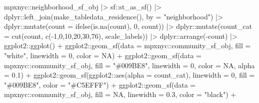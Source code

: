 \documentclass[
  letterpaper,
  DIV=11,
  numbers=noendperiod,
  oneside]{scrreprt}
\newenvironment{Shaded}{\begin{snugshade}}{\end{snugshade}}
\newcommand{\AttributeTok}[1]{\textcolor[rgb]{0.40,0.45,0.13}{#1}}
\newcommand{\ConstantTok}[1]{\textcolor[rgb]{0.56,0.35,0.01}{#1}}
\newcommand{\DecValTok}[1]{\textcolor[rgb]{0.68,0.00,0.00}{#1}}
\newcommand{\FloatTok}[1]{\textcolor[rgb]{0.68,0.00,0.00}{#1}}
\newcommand{\FunctionTok}[1]{\textcolor[rgb]{0.28,0.35,0.67}{#1}}
\newcommand{\NormalTok}[1]{\textcolor[rgb]{0.00,0.23,0.31}{#1}}
\newcommand{\SpecialCharTok}[1]{\textcolor[rgb]{0.37,0.37,0.37}{#1}}
\newcommand{\StringTok}[1]{\textcolor[rgb]{0.13,0.47,0.30}{#1}}
\begin{document}
\begin{Shaded}
\begin{Highlighting}[]
\NormalTok{mpxnyc}\SpecialCharTok{::}\NormalTok{neighborhood\_sf\_obj }\SpecialCharTok{|\textgreater{}}
\NormalTok{   sf}\SpecialCharTok{::}\FunctionTok{st\_as\_sf}\NormalTok{() }\SpecialCharTok{|\textgreater{}}
\NormalTok{  dplyr}\SpecialCharTok{::}\FunctionTok{left\_join}\NormalTok{(}\FunctionTok{make\_tabledata\_residence}\NormalTok{(), }\AttributeTok{by =} \StringTok{"neighborhood"}\NormalTok{) }\SpecialCharTok{|\textgreater{}}
\NormalTok{  dplyr}\SpecialCharTok{::}\FunctionTok{mutate}\NormalTok{(}\AttributeTok{count =} \FunctionTok{ifelse}\NormalTok{(}\FunctionTok{is.na}\NormalTok{(count), }\DecValTok{0}\NormalTok{, count)) }\SpecialCharTok{|\textgreater{}}
\NormalTok{  dplyr}\SpecialCharTok{::}\FunctionTok{mutate}\NormalTok{(}\AttributeTok{count\_cat =} \FunctionTok{cut}\NormalTok{(count, }\FunctionTok{c}\NormalTok{(}\SpecialCharTok{{-}}\DecValTok{1}\NormalTok{,}\DecValTok{0}\NormalTok{,}\DecValTok{10}\NormalTok{,}\DecValTok{20}\NormalTok{,}\DecValTok{30}\NormalTok{,}\DecValTok{76}\NormalTok{), scale\_labels)) }\SpecialCharTok{|\textgreater{}}
\NormalTok{  dplyr}\SpecialCharTok{::}\FunctionTok{arrange}\NormalTok{(}\SpecialCharTok{{-}}\NormalTok{count) }\SpecialCharTok{|\textgreater{}}
\NormalTok{  ggplot2}\SpecialCharTok{::}\FunctionTok{ggplot}\NormalTok{() }\SpecialCharTok{+}
\NormalTok{  ggplot2}\SpecialCharTok{::}\FunctionTok{geom\_sf}\NormalTok{(}\AttributeTok{data =}\NormalTok{ mpxnyc}\SpecialCharTok{::}\NormalTok{community\_sf\_obj, }\AttributeTok{fill =} \StringTok{"white"}\NormalTok{, }\AttributeTok{linewidth =} \DecValTok{0}\NormalTok{, }\AttributeTok{color =} \ConstantTok{NA}\NormalTok{) }\SpecialCharTok{+}
\NormalTok{  ggplot2}\SpecialCharTok{::}\FunctionTok{geom\_sf}\NormalTok{(}\AttributeTok{data =}\NormalTok{ mpxnyc}\SpecialCharTok{::}\NormalTok{community\_sf\_obj, }\AttributeTok{fill =} \StringTok{"\#009BE8"}\NormalTok{, }\AttributeTok{linewidth =} \DecValTok{0}\NormalTok{, }\AttributeTok{color =} \ConstantTok{NA}\NormalTok{, }\AttributeTok{alpha =} \FloatTok{0.1}\NormalTok{) }\SpecialCharTok{+}
\NormalTok{  ggplot2}\SpecialCharTok{::}\FunctionTok{geom\_sf}\NormalTok{(ggplot2}\SpecialCharTok{::}\FunctionTok{aes}\NormalTok{(}\AttributeTok{alpha =}\NormalTok{ count\_cat), }\AttributeTok{linewidth =} \DecValTok{0}\NormalTok{, }\AttributeTok{fill =} \StringTok{"\#009BE8"}\NormalTok{, }\AttributeTok{color =} \StringTok{"\#C5EFFF"}\NormalTok{) }\SpecialCharTok{+}
\NormalTok{  ggplot2}\SpecialCharTok{::}\FunctionTok{geom\_sf}\NormalTok{(}\AttributeTok{data =}\NormalTok{ mpxnyc}\SpecialCharTok{::}\NormalTok{community\_sf\_obj, }\AttributeTok{fill =} \ConstantTok{NA}\NormalTok{, }\AttributeTok{linewidth =} \FloatTok{0.3}\NormalTok{, }\AttributeTok{color =} \StringTok{"black"}\NormalTok{) }\SpecialCharTok{+}

\end{Highlighting}
\end{Shaded}
\end{document}
